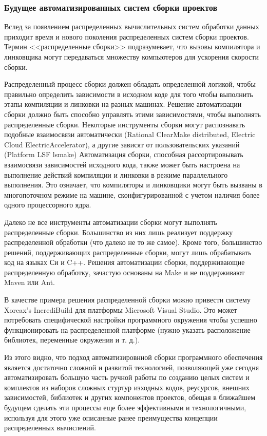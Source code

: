 \subsubsection{Будущее автоматизированных систем сборки проектов}
Вслед за появлением распределенных вычислительных систем обработки данных приходит время и нового поколения распределенных систем сборки проектов.  Термин <<распределенные сборки>> подразумевает, что вызовы компилятора и линковщика могут передаваться множеству компьютеров для ускорения скорости сборки.

Распределенный процесс сборки должен обладать определенной логикой, чтобы правильно определить зависимости в исходном коде для того чтобы выполнить этапы компиляции и линковки на разных машинах. Решение автоматизации сборки должно быть способно управлять этими зависимостями, чтобы выполнять распределенные сборки. Некоторые инструменты сборки могут распознавать подобные взаимосвязи автоматически (Rational ClearMake distributed, Electric Cloud ElectricAccelerator), а другие зависят от пользовательских указаний (Platform LSF lsmake) Автоматизация сборки, способная рассортировывать взаимосвязи зависимостей исходного кода, также может быть настроена на выполнение действий компиляции и линковки в режиме параллельного выполнения. Это означает, что компиляторы и линковщики могут быть вызваны в многопоточном режиме на машине, сконфигурированной с учетом наличия более одного процессорного ядра.

Далеко не все инструменты автоматизации сборки могут выполнять распределенные сборки. Большинство из них лишь реализует поддержку распределенной обработки (что далеко не то же самое). Кроме того, большинство решений, поддерживающих распределенные сборки, могут лишь обрабатывать код на языках Си и C++. Решения автоматизации сборки, поддерживающие распределенную обработку, зачастую основаны на Make и не поддерживают Maven или Ant.

В качестве примера решения распределенной сборки можно привести систему Xoreax’s IncrediBuild для платформы Microsoft Visual Studio. Это может потребовать специфической настройки программного окружения чтобы успешно функционировать на распределенной платформе (нужно указать расположение библиотек, переменные окружения и т. д.).

Из этого видно, что подход автоматизировнной сборки программного обеспечения является достаточно сложной и развитой технологией, позволяющей уже сегодня автоматизировать большую часть ручной работы по созданию целых систем и комплектов из наборов сложных стуртур изходных кодов, реусурсов, внешних зависимостей, библиотек и других компонентов проектов, обещая в ближайшем будущем сделать эти процессы еще более эффективными и технологичными, используя для этого уже описанные ранее преимущества концепции распределенных вычислений.
